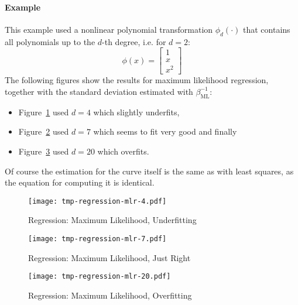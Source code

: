 			\paragraph{Example}
				This example used a nonlinear polynomial transformation \( \phi_d(\cdot) \) that contains all polynomials up to the \(d\)-th degree, i.e. for \( d = 2 \):
				\begin{equation}
					\phi(x) =
						\begin{bmatrix}
							1 \\
							x \\
							x^2
						\end{bmatrix}
				\end{equation}
				The following figures show the results for maximum likelihood regression, together with the standard deviation estimated with \( \beta_\textrm{ML}^{-1} \):
				\begin{itemize}
					\item Figure~\ref{fig:regressionMlUnderfit} used \( d = 4 \) which slightly underfits,
					\item Figure~\ref{fig:regressionMlRight} used \( d = 7 \) which seems to fit very good and finally
					\item Figure~\ref{fig:regressionMlOverfit} used \( d = 20 \) which overfits.
				\end{itemize}
				Of course the estimation for the curve itself is the same as with least squares, as the equation for computing it is identical.
				
				\begin{figure}
					\centering
					\texttt{[image: tmp-regression-mlr-4.pdf]}
					\caption{Regression: Maximum Likelihood, Underfitting}
					\label{fig:regressionMlUnderfit}
				\end{figure}
				\begin{figure}
					\centering
					\texttt{[image: tmp-regression-mlr-7.pdf]}
					\caption{Regression: Maximum Likelihood, Just Right}
					\label{fig:regressionMlRight}
				\end{figure}
				\begin{figure}
					\centering
					\texttt{[image: tmp-regression-mlr-20.pdf]}
					\caption{Regression: Maximum Likelihood, Overfitting}
					\label{fig:regressionMlOverfit}
				\end{figure}

